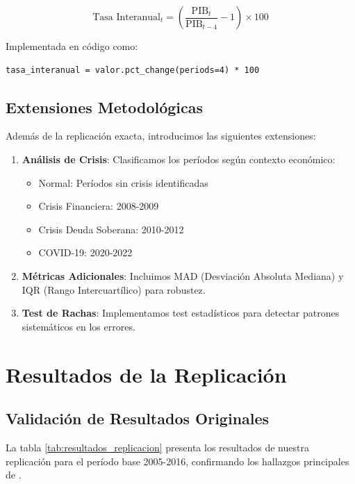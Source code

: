 \documentclass[12pt,a4paper]{article}
\begin{document}
\begin{equation}
\text{Tasa Interanual}_t = \left(\frac{\text{PIB}_t}{\text{PIB}_{t-4}} - 1\right) \times 100
\end{equation}

Implementada en código como:
\begin{verbatim}
tasa_interanual = valor.pct_change(periods=4) * 100
\end{verbatim}

\subsection{Extensiones Metodológicas}

Además de la replicación exacta, introducimos las siguientes extensiones:

\begin{enumerate}
\item \textbf{Análisis de Crisis}: Clasificamos los períodos según contexto económico:
   \begin{itemize}
   \item Normal: Períodos sin crisis identificadas
   \item Crisis Financiera: 2008-2009
   \item Crisis Deuda Soberana: 2010-2012  
   \item COVID-19: 2020-2022
   \end{itemize}

\item \textbf{Métricas Adicionales}: Incluimos MAD (Desviación Absoluta Mediana) y IQR (Rango Intercuartílico) para robustez.

\item \textbf{Test de Rachas}: Implementamos test estadísticos para detectar patrones sistemáticos en los errores.
\end{enumerate}

\section{Resultados de la Replicación}

\subsection{Validación de Resultados Originales}

La tabla \ref{tab:resultados_replicacion} presenta los resultados de nuestra replicación para el período base 2005-2016, confirmando los hallazgos principales de \citet{pavia2017}.
\end{document}
